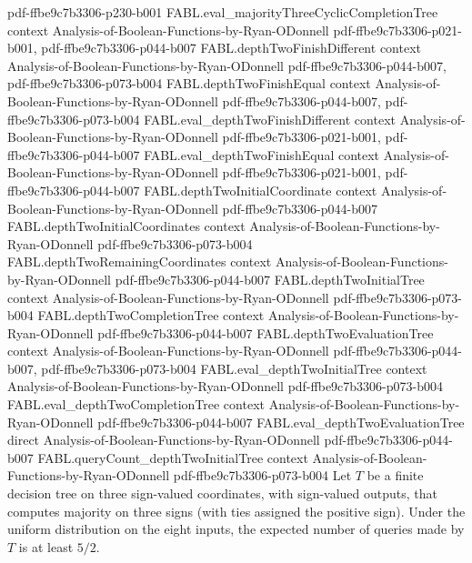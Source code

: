 \begin{theorem}
  {pdf-ffbe9c7b3306-p230-b001}
\proofstep
  {FABL.eval_majorityThreeCyclicCompletionTree}
  {context}
  {Analysis-of-Boolean-Functions-by-Ryan-ODonnell}
  {pdf-ffbe9c7b3306-p021-b001,
    pdf-ffbe9c7b3306-p044-b007}
\proofstep
  {FABL.depthTwoFinishDifferent}
  {context}
  {Analysis-of-Boolean-Functions-by-Ryan-ODonnell}
  {pdf-ffbe9c7b3306-p044-b007,
    pdf-ffbe9c7b3306-p073-b004}
\proofstep
  {FABL.depthTwoFinishEqual}
  {context}
  {Analysis-of-Boolean-Functions-by-Ryan-ODonnell}
  {pdf-ffbe9c7b3306-p044-b007,
    pdf-ffbe9c7b3306-p073-b004}
\proofstep
  {FABL.eval_depthTwoFinishDifferent}
  {context}
  {Analysis-of-Boolean-Functions-by-Ryan-ODonnell}
  {pdf-ffbe9c7b3306-p021-b001,
    pdf-ffbe9c7b3306-p044-b007}
\proofstep
  {FABL.eval_depthTwoFinishEqual}
  {context}
  {Analysis-of-Boolean-Functions-by-Ryan-ODonnell}
  {pdf-ffbe9c7b3306-p021-b001,
    pdf-ffbe9c7b3306-p044-b007}
\proofstep
  {FABL.depthTwoInitialCoordinate}
  {context}
  {Analysis-of-Boolean-Functions-by-Ryan-ODonnell}
  {pdf-ffbe9c7b3306-p044-b007}
\proofstep
  {FABL.depthTwoInitialCoordinates}
  {context}
  {Analysis-of-Boolean-Functions-by-Ryan-ODonnell}
  {pdf-ffbe9c7b3306-p073-b004}
\proofstep
  {FABL.depthTwoRemainingCoordinates}
  {context}
  {Analysis-of-Boolean-Functions-by-Ryan-ODonnell}
  {pdf-ffbe9c7b3306-p044-b007}
\proofstep
  {FABL.depthTwoInitialTree}
  {context}
  {Analysis-of-Boolean-Functions-by-Ryan-ODonnell}
  {pdf-ffbe9c7b3306-p073-b004}
\proofstep
  {FABL.depthTwoCompletionTree}
  {context}
  {Analysis-of-Boolean-Functions-by-Ryan-ODonnell}
  {pdf-ffbe9c7b3306-p044-b007}
\proofstep
  {FABL.depthTwoEvaluationTree}
  {context}
  {Analysis-of-Boolean-Functions-by-Ryan-ODonnell}
  {pdf-ffbe9c7b3306-p044-b007,
    pdf-ffbe9c7b3306-p073-b004}
\proofstep
  {FABL.eval_depthTwoInitialTree}
  {context}
  {Analysis-of-Boolean-Functions-by-Ryan-ODonnell}
  {pdf-ffbe9c7b3306-p073-b004}
\proofstep
  {FABL.eval_depthTwoCompletionTree}
  {context}
  {Analysis-of-Boolean-Functions-by-Ryan-ODonnell}
  {pdf-ffbe9c7b3306-p044-b007}
\proofstep
  {FABL.eval_depthTwoEvaluationTree}
  {direct}
  {Analysis-of-Boolean-Functions-by-Ryan-ODonnell}
  {pdf-ffbe9c7b3306-p044-b007}
\proofstep
  {FABL.queryCount_depthTwoInitialTree}
  {context}
  {Analysis-of-Boolean-Functions-by-Ryan-ODonnell}
  {pdf-ffbe9c7b3306-p073-b004}
Let $T$ be a finite decision tree on three sign-valued coordinates, with sign-valued
outputs, that computes majority on three signs (with ties assigned the positive sign).
Under the uniform distribution on the eight inputs, the expected number of queries made
by $T$ is at least $5/2$.
\end{theorem}

